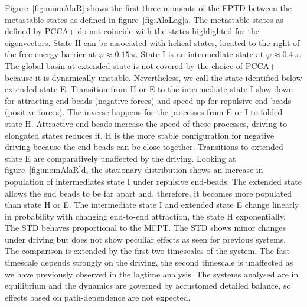  Figure~\ref{fig:momAlaR} shows the first three moments of the FPTD between the metastable states as defined in figure~\ref{fig:AlaLag}a. The metastable states as defined by PCCA+ do not coincide with the states highlighted for the eigenvectors. State H can be associated with  helical states, located to the right of the free-energy barrier at $\varphi \approx 0.15\,\pi$. State I is an intermediate state at $\varphi \approx 0.4\,\pi$. The global basin at extended state is not covered by the choice of PCCA+ because it is dynamically unstable. Nevertheless, we call the state identified below  extended state E. Transition from H or E to the intermediate state I slow down for attracting end-beads (negative forces) and speed up for repulsive end-beads (positive forces). The inverse happens for the processes from E or I to folded state H. Attractive end-beads increase the speed of these processes, driving to elongated states reduces it. H is the more stable configuration for negative driving because the end-beads can be close together. Transitions to extended state E are comparatively unaffected by the driving. Looking at figure~\ref{fig:momAlaR}d, the stationary distribution shows an increase in population of intermediates state I under repulsive end-beads. The extended state allows the end beads to be far apart and, therefore, it becomes more populated than state H or E.  The intermediate  state I and extended state E change linearly in probability with changing end-to-end attraction, the state H exponentially. The STD behaves proportional to the MFPT. The STD  shows minor changes under driving but does not show peculiar effects as seen for previous systems. The comparison is extended by the first two timescales of the system. The fast timescale depends strongly on the driving, the second timescale is unaffected as we have previously observed in the lagtime analysis. The systems analysed are in equilibrium and the dynamics are governed by accustomed detailed balance, so effects based on path-dependence are not expected. 
 
